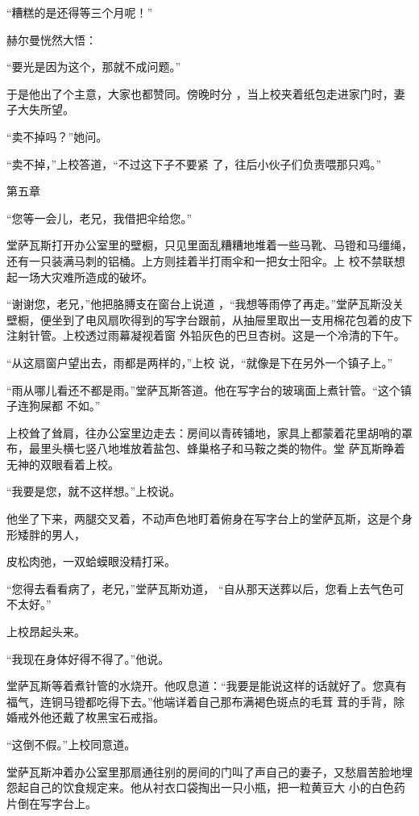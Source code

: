 \documentclass{article}
\begin{document}
“糟糕的是还得等三个月呢！” 


赫尔曼恍然大悟： 

\newpage


“要光是因为这个，那就不成问题。” 

于是他出了个主意，大家也都赞同。傍晚时分
，当上校夹着纸包走进家门时，妻子大失所望。 


“卖不掉吗？”她问。 

“卖不掉，”上校答道，“不过这下子不要紧
了，往后小伙子们负责喂那只鸡。” 



第五章 


“您等一会儿，老兄，我借把伞给您。” 

堂萨瓦斯打开办公室里的壁橱，只见里面乱糟糟地堆着一些马靴、马镫和马缰绳，还有一只装满马刺的铝桶。上方则挂着半打雨伞和一把女士阳伞。上
校不禁联想起一场大灾难所造成的破坏。 

“谢谢您，老兄，”他把胳膊支在窗台上说道
\newpage
，“我想等雨停了再走。”堂萨瓦斯没关壁橱，便坐到了电风扇吹得到的写字台跟前，从抽屉里取出一支用棉花包着的皮下注射针管。上校透过雨幕凝视着窗
外铅灰色的巴旦杏树。这是一个冷清的下午。 

“从这扇窗户望出去，雨都是两样的，”上校
说，“就像是下在另外一个镇子上。” 

“雨从哪儿看还不都是雨。”堂萨瓦斯答道。他在写字台的玻璃面上煮针管。“这个镇子连狗屎都
不如。” 

上校耸了耸肩，往办公室里边走去：房间以青砖铺地，家具上都蒙着花里胡哨的罩布，最里头横七竖八地堆放着盐包、蜂巢格子和马鞍之类的物件。堂
萨瓦斯睁着无神的双眼看着上校。 


“我要是您，就不这样想。”上校说。 

他坐了下来，两腿交叉着，不动声色地盯着俯身在写字台上的堂萨瓦斯，这是个身形矮胖的男人，
\newpage

皮松肉弛，一双蛤蟆眼没精打采。 

“您得去看看病了，老兄，”堂萨瓦斯劝道，
“自从那天送葬以后，您看上去气色可不太好。” 


上校昂起头来。 


“我现在身体好得不得了。”他说。 

堂萨瓦斯等着煮针管的水烧开。他叹息道：“我要是能说这样的话就好了。您真有福气，连铜马镫都吃得下去。”他端详着自己那布满褐色斑点的毛茸
茸的手背，除婚戒外他还戴了枚黑宝石戒指。 


“这倒不假。”上校同意道。 

堂萨瓦斯冲着办公室里那扇通往别的房间的门叫了声自己的妻子，又愁眉苦脸地埋怨起自己的饮食规定来。他从衬衣口袋掏出一只小瓶，把一粒黄豆大
小的白色药片倒在写字台上。 
\end{document}
